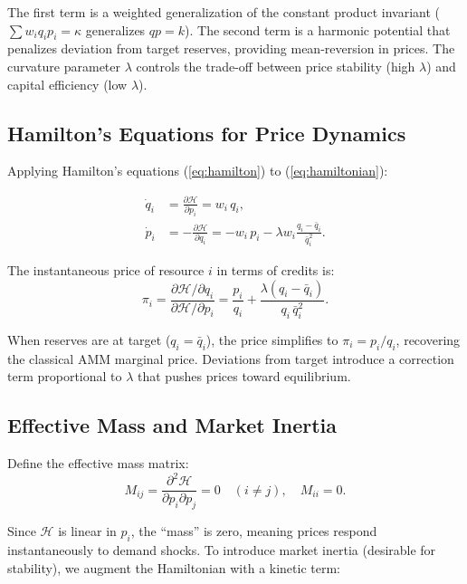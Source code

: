 The first term is a weighted generalization of the constant product invariant ($\sum w_i q_i p_i = \kappa$ generalizes $qp = k$). The second term is a harmonic potential that penalizes deviation from target reserves, providing mean-reversion in prices. The curvature parameter $\lambda$ controls the trade-off between price stability (high $\lambda$) and capital efficiency (low $\lambda$).

\subsection{Hamilton's Equations for Price Dynamics}

Applying Hamilton's equations (\ref{eq:hamilton}) to (\ref{eq:hamiltonian}):

\begin{align}
\dot{q}_i &= \frac{\partial \mathcal{H}}{\partial p_i} = w_i \, q_i, \label{eq:qdot} \\
\dot{p}_i &= -\frac{\partial \mathcal{H}}{\partial q_i} = -w_i \, p_i - \lambda w_i \frac{q_i - \bar{q}_i}{\bar{q}_i^2}. \label{eq:pdot}
\end{align}

The instantaneous price of resource $i$ in terms of credits is:
\begin{equation}
\pi_i = \frac{\partial \mathcal{H} / \partial q_i}{\partial \mathcal{H} / \partial p_i} = \frac{p_i}{q_i} + \frac{\lambda(q_i - \bar{q}_i)}{q_i \, \bar{q}_i^2}.
\label{eq:price}
\end{equation}

When reserves are at target ($q_i = \bar{q}_i$), the price simplifies to $\pi_i = p_i / q_i$, recovering the classical AMM marginal price. Deviations from target introduce a correction term proportional to $\lambda$ that pushes prices toward equilibrium.

\subsection{Effective Mass and Market Inertia}

Define the effective mass matrix:
\begin{equation}
M_{ij} = \frac{\partial^2 \mathcal{H}}{\partial p_i \partial p_j} = 0 \quad (i \neq j), \quad M_{ii} = 0.
\end{equation}

Since $\mathcal{H}$ is linear in $p_i$, the ``mass'' is zero, meaning prices respond instantaneously to demand shocks. To introduce market inertia (desirable for stability), we augment the Hamiltonian with a kinetic term:


